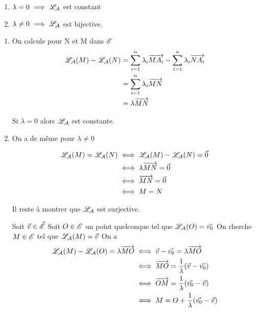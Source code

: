 \documentclass[a4paper, 12pt]{article}
\begin{document}
\begin{theoreme}{}{}
    \begin{enumerate}
        \item $\lambda = 0 \implies \mathscr{L}_\mathcal{A}$ est constant
        \item $\lambda \neq 0 \implies \mathscr{L}_\mathcal{A}$ est bijective.
    \end{enumerate}
\end{theoreme}
\break
\begin{demonstration}
    \begin{enumerate}
        \item On calcule pour N et M dans $\mathscr{E}$
        \begin{align*}
            \mathscr{L}_\mathcal{A}(M) - \mathscr{L}_\mathcal{A}(N) &= \sum_{i=1}^n \lambda_i \overrightarrow{M A_i} - \sum_{i=1}^n \lambda_i \overrightarrow{N A_i} \\
            &= \sum_{i=1}^n \lambda_i \overrightarrow{MN} \\
            &= \lambda \overrightarrow{MN}
        \end{align*}

        Si $\lambda = 0$ alors $\mathscr{L}_\mathcal{A}$ est constante.

        \item On a de même pour $\lambda \neq 0$

        \begin{align*}
            \mathscr{L}_\mathcal{A}(M) = \mathscr{L}_\mathcal{A}(N) &\iff \mathscr{L}_\mathcal{A}(M) - \mathscr{L}_\mathcal{A}(N) = \vec{0} \\
            &\iff \lambda \overrightarrow{MN} = \vec{0} \\
            &\iff \overrightarrow{MN} = \vec{0} \\
            &\iff M = N
        \end{align*}

        Il reste à montrer que $\mathscr{L}_\mathcal{A}$ est surjective.

        Soit $\vec{v} \in \vec{\mathscr{E}}$
        Soit $O \in \mathscr{E}$ un point quelconque tel que $\mathscr{L}_\mathcal{A}(O) = \vec{v_0}$
        On cherche $M \in \mathscr{E}$ tel que $\mathscr{L}_\mathcal{A}(M) = \vec{v}$
        On a
        \begin{align*}
            \mathscr{L}_\mathcal{A}(M) - \mathscr{L}_\mathcal{A}(O) = \lambda \overrightarrow{MO} &\iff \vec{v} - \vec{v_0} = \lambda \overrightarrow{MO} \\
            &\iff \overrightarrow{MO} = \frac{1}{\lambda} (\vec{v} - \vec{v_0}) \\
            &\iff \overrightarrow{OM} = \frac{1}{\lambda} (\vec{v_0} - \vec{v}) \\
            &\iff M = O + \frac{1}{\lambda} (\vec{v_0} - \vec{v})
        \end{align*}
    \end{enumerate}
\end{demonstration}
\end{document}
